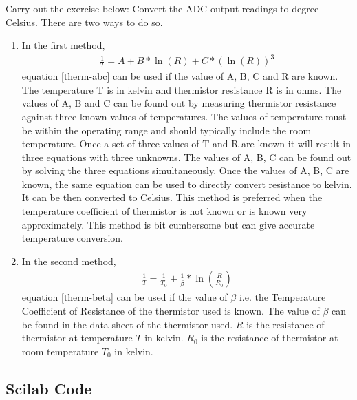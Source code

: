 \begin{exercise}
  Carry out the exercise below: Convert the ADC output readings to
  degree Celsius. There are two ways to do so.
  \begin{enumerate}
    \item  In the first method,
          \begin{align}
            \frac{1}{T}=A+B*\ln(R)+C*(\ln(R))^3
            \label{therm-abc}
          \end{align}
          equation \ref{therm-abc} can be used if the value of A, B, C and R are
          known. The temperature T is in kelvin and thermistor resistance R is
          in ohms. The values of A, B and C can be found out by measuring
          thermistor resistance against three known values of temperatures. The
          values of temperature must be within the operating range and should
          typically include the room temperature. Once a set of three values of
          T and R are known it will result in three equations with three
          unknowns. The values of A, B, C can be found out by solving the three
          equations simultaneously. Once the values of A, B, C are known, the
          same equation can be used to directly convert resistance to kelvin. It
          can be then converted to Celsius. This method is preferred when the
          temperature coefficient of thermistor is not known or is known very
          approximately. This method is bit cumbersome but can give accurate
          temperature conversion.

    \item In the second method,
          \begin{align}
            \frac{1}{T}=\frac{1}{T_0}+\frac{1}{\beta}*\ln\left(\frac{R}{R_0}\right)
            \label{therm-beta}
          \end{align}
          equation \ref{therm-beta} can be used if the value of $\beta$ i.e. the
          Temperature Coefficient of Resistance of the thermistor used is
          known. The value of $\beta$ can be found in the data sheet of the
          thermistor used. $R$ is the resistance of thermistor at temperature
          $T$ in kelvin.  $R_0$ is the resistance of thermistor at room
          temperature $T_0$ in kelvin.
  \end{enumerate}
\end{exercise}

\subsection{Scilab Code}
\label{sec:therm-scilab-code}

